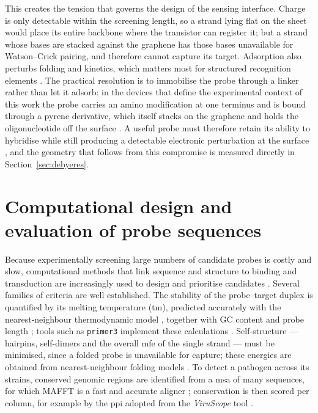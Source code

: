 This creates the tension that governs the design of the sensing interface. Charge is only
detectable within the screening length, so a strand lying flat on the sheet would place its entire
backbone where the transistor can register it; but a strand whose bases are stacked against the
graphene has those bases unavailable for Watson--Crick pairing, and therefore cannot capture its
target. Adsorption also perturbs folding and kinetics, which matters most for structured
recognition elements \citep{green2015}. The practical resolution is to immobilise the probe
through a linker rather than let it adsorb: in the devices that define the experimental context of
this work the probe carries an amino modification at one terminus and is bound through a pyrene
derivative, which itself stacks on the graphene and holds the oligonucleotide off the surface
\citep{campos2019,purwidyantri2021}. A useful probe must therefore retain its ability to hybridise
while still producing a detectable electronic perturbation at the surface \citep{green2015}, and
the geometry that follows from this compromise is measured directly in Section~\ref{sec:debyeres}.

\section{Computational design and evaluation of probe sequences}

Because experimentally screening large numbers of candidate probes is costly and slow, computational
methods that link sequence and structure to binding and transduction are increasingly used to design and
prioritise candidates \citep{sun2022}. Several families of criteria are well established. The
stability of the probe--target duplex is quantified by its melting temperature (\acrshort{tm}), predicted
accurately with the nearest-neighbour thermodynamic model \citep{santalucia2004}, together with GC
content and probe length \citep{wetmur1991}; tools such as \texttt{primer3} implement these calculations
\citep{untergasser2012}. Self-structure --- hairpins, self-dimers and the overall \acrfull{mfe} of the single
strand --- must be minimised, since a folded probe is unavailable for capture; these energies are obtained
from nearest-neighbour folding models \citep{turner2010,zadeh2011,seqfold}. To detect a pathogen across
its strains, conserved genomic regions are identified from a \acrfull{msa} of many sequences, for which
MAFFT is a fast and accurate aligner \citep{katoh2013}; conservation is then scored per column, for
example by the \acrfull{ppi} adopted from the \emph{ViruScope} tool \citep{viruscope}.

